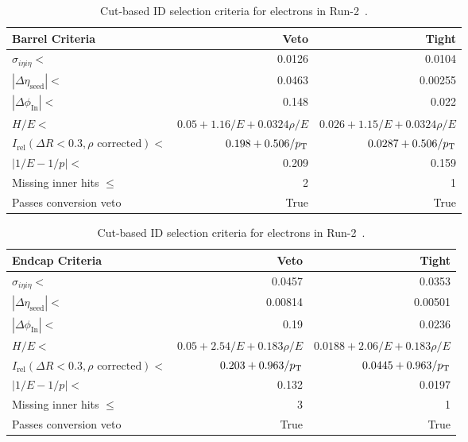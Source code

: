 \begin{table}[htb!]
	\centering
	\caption[Cut-based ID selection criteria for electrons in Run-2.]{Cut-based ID selection criteria for electrons in Run-2~\cite{electronid}.}
	\label{tab:electronID}
	\begin{tabular}{l | r | r}
		\hline
		Barrel Criteria & Veto & Tight \\
		\hline
		\hline
		$\sigma_{i\eta i\eta}<$ & 0.0126 & 0.0104 \\
		$|\Delta\eta_\text{seed}|<$ & 0.0463 & 0.00255 \\
		$|\Delta\phi_\text{In}|<$ & 0.148 & 0.022 \\
		$H/E<$ & $0.05+1.16/E+0.0324\rho/E$ & $0.026+1.15/E+0.0324\rho/E$ \\
		$I_\text{rel}(\Delta R<0.3,\rho\text{ corrected})<$ & $0.198+0.506/p_{\mathrm{T}}$ & $0.0287+0.506/p_{\mathrm{T}}$\\
		$|1/E-1/p|<$  & 0.209 & 0.159 \\
		Missing inner hits $\leq$ & 2 & 1 \\
		Passes conversion veto & True & True\\
		\hline
	\end{tabular}
	\centering
	\begin{tabular}{l | r | r}
		\hline
		Endcap Criteria & Veto & Tight \\
		\hline
		\hline
		$\sigma_{i\eta i\eta}<$ & 0.0457 & 0.0353 \\
		$|\Delta\eta_\text{seed}|<$ & 0.00814 & 0.00501 \\
		$|\Delta\phi_\text{In}|<$ & 0.19 & 0.0236 \\
		$H/E<$ & $0.05+2.54/E+0.183\rho/E$ & $0.0188+2.06/E+0.183\rho/E$ \\
		$I_\text{rel}(\Delta R<0.3,\rho\text{ corrected})<$ & $0.203+0.963/p_{\mathrm{T}}$ & $0.0445+0.963/p_{\mathrm{T}}$\\
		$|1/E-1/p|<$ & 0.132 & 0.0197 \\
		Missing inner hits $\leq$ & 3 & 1 \\
		Passes conversion veto & True & True\\
		\hline
	\end{tabular}
\end{table}


